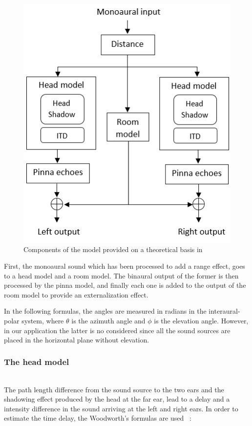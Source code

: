 \documentclass[journal]{IEEEtran}
\begin{document}
\begin{figure}
	\centering
		\includegraphics[scale=0.75]{graphics/graphic.png}
	\caption{Components of the model provided on a theoretical basis in~\cite{Brown1997}}
	\label{fig:workflow}
\end{figure}


First, the monoaural sound which has been processed to add a range effect, goes to a head model and a room model. The binaural output of the former is then processed by the pinna model, and finally each one is added to the output of the room model to provide an externalization effect.

In the following formulas, the angles are measured in radians in the interaural-polar system, where $\theta$ is the azimuth angle and $\phi$ is the elevation angle. However, in our application the latter is no considered since all the sound sources are placed in the horizontal plane without elevation.\\


\subsubsection{The head model}~\\


 The path length difference from the sound source to the two ears and the shadowing effect produced by the head at the far ear, lead to a delay and a intensity difference in the sound arriving at the left and right ears. In order to estimate the time delay, the Woodworth's formulas are used~\cite{Woodworth} :
\end{document}
